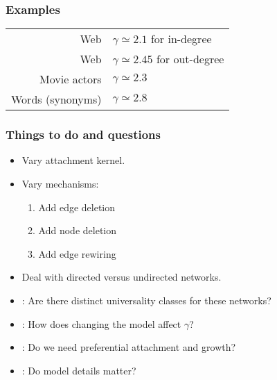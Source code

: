 \begin{frame}[label=]
 \frametitle{Examples}  


 \begin{block}{}
  \begin{center}
    \begin{tabular}{rl}
      Web & $\gamma \simeq 2.1$ for in-degree \\
      Web & $\gamma \simeq 2.45$ for out-degree \\
      Movie actors & $\gamma \simeq 2.3$ \\
      Words (synonyms) & $\gamma \simeq 2.8$ \\
    \end{tabular}
  \end{center}

 \end{block}

\end{frame}


\begin{frame}[label=]
 \frametitle{Things to do and questions}  

 \begin{block}{}
 \begin{itemize}
 \item<1-> Vary attachment kernel.
 \item<1-> Vary mechanisms:
   \begin{enumerate}
   \item<1-> Add edge deletion
   \item<1-> Add node deletion
   \item<1-> Add edge rewiring
   \end{enumerate}
 \item<+-> Deal with directed versus undirected networks.
 \item<+-> :
   Are there distinct universality classes for these networks?  
 \item<+->
   :
   How does changing the model affect $\gamma$?
 \item<+->
   :
   Do we need preferential attachment and growth?
 \item<+->
   :
   Do model details matter?
 \end{itemize}
 \end{block}

\end{frame}

